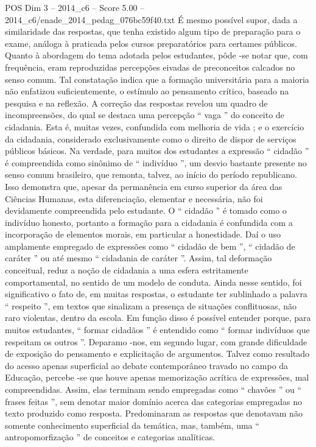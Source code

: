 \begin{textsample}{POS Dim 3 – 2014\_c6 – Score 5.00 – 2014\_c6/enade\_2014\_pedag\_076bc59f40.txt}
É mesmo possível supor, dada a similaridade das respostas, que tenha existido algum tipo de preparação para o exame, análoga à praticada pelos cursos preparatórios para certames públicos.
Quanto à abordagem do tema adotada pelos estudantes, pôde -se notar que, com frequência, eram reproduzidas percepções eivadas de preconceitos calcados no senso comum.
Tal constatação indica que a formação universitária para a maioria não enfatizou suficientemente, o estímulo ao pensamento crítico, baseado na pesquisa e na reflexão.
A correção das respostas revelou um quadro de incompreensões, do qual se destaca uma percepção “ vaga ” do conceito de cidadania.
Esta é, muitas vezes, confundida com melhoria de vida ; e o exercício da cidadania, considerado exclusivamente como o direito de dispor de serviços públicos básicos.
Na verdade, para muitos dos estudantes a expressão “ cidadão ” é compreendida como sinônimo de “ indivíduo ”, um desvio bastante presente no senso comum brasileiro, que remonta, talvez, ao início do período republicano.
Isso demonstra que, apesar da permanência em curso superior da área das Ciências Humanas, esta diferenciação, elementar e necessária, não foi devidamente compreendida pelo estudante.
O “ cidadão ” é tomado como o indivíduo honesto, portanto a formação para a cidadania é confundida com a incorporação de elementos morais, em particular a honestidade.
Daí o uso amplamente empregado de expressões como “ cidadão de bem ”, “ cidadão de caráter ” ou até mesmo “ cidadania de caráter ”.
Assim, tal deformação conceitual, reduz a noção de cidadania a uma esfera estritamente comportamental, no sentido de um modelo de conduta.
Ainda nesse sentido, foi significativo o fato de, em muitas respostas, o estudante ter sublinhado a palavra “ respeito ”, em textos que sinalizam a presença de situações conflituosas, não raro violentas, dentro da escola.
Em função disso é possível entender porque, para muitos estudantes, “ formar cidadãos ” é entendido como “ formar indivíduos que respeitam os outros ”.
Deparamo -nos, em segundo lugar, com grande dificuldade de exposição do pensamento e explicitação de argumentos.
Talvez como resultado do acesso apenas superficial ao debate contemporâneo travado no campo da Educação, percebe -se que houve apenas memorização acrítica de expressões, mal compreendidas.
Assim, elas terminam sendo empregadas como “ chavões ” ou “ frases feitas ”, sem denotar maior domínio acerca das categorias empregadas no texto produzido como resposta.
Predominaram as respostas que denotavam não somente conhecimento superficial da temática, mas, também, uma “ antropomorfização ” de conceitos e categorias analíticas.

\end{textsample}
